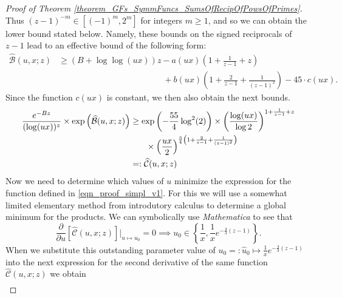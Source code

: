 \documentclass[11pt,reqno,a4letter]{article}
\numberwithin{figure}{section}
\numberwithin{table}{section}
\theoremstyle{plain}
\numberwithin{theorem}{section}
\theoremstyle{definition}
\begin{document}
\begin{proof}[Proof of Theorem \ref{theorem_GFs_SymmFuncs_SumsOfRecipOfPowsOfPrimes}]
Thus $(z-1)^{-m} \in [(-1)^m, 2^m]$ for integers $m \geq 1$, and so we can obtain the 
lower bound stated below. Namely, these bounds on the signed reciprocals of $z-1$ 
lead to an effective bound of the following form: 
\begin{align*} 
\widehat{\mathcal{B}}(u, x; z) & \geq (B + \log\log (ux)) z - a(ux) \left(1 + \frac{1}{z-1} + z\right) \\ 
     & \phantom{= (B + \log\log (ux)) z\ } + 
     b(ux) \left( 
     1 + \frac{2}{z-1} + \frac{1}{(z-1)^2}\right) - 
     45 \cdot c(ux). 
\end{align*} 
Since the function $c(ux)$ is constant, we then also obtain the next bounds. 
\begin{align} 
\notag 
\frac{e^{-Bz}}{(\log (ux))^{z}} \times \exp\left(\widehat{\mathcal{B}}(u, x; z)\right) & \geq 
    \exp\left(-\frac{55}{4} \log^2(2)\right) \times \left(\frac{\log(ux)}{\log 2}\right)^{1 + \frac{1}{z-1} + z} \\ 
\notag 
    & \phantom{\geq \times} \times \left(\frac{ux}{2}\right)^{\frac{3}{4}\left(1 + \frac{2}{z-1} + \frac{1}{(z-1)^2}\right)} \\ 
\label{eqn_proof_simpl_v1} 
     & =: \widehat{\mathcal{C}}(u, x; z) 
\end{align} 
Now we need to determine which values of $u$ minimize the expression for the function defined 
in \eqref{eqn_proof_simpl_v1}. 
For this we will use a somewhat limited elementary method from 
introdutory calculus to determine a global minimum for the products. 
We can symbolically use \emph{Mathematica} to see that 
\[
\frac{\partial}{\partial u}\left[\widehat{\mathcal{C}}(u, x; z)\right] \Biggr\rvert_{u \mapsto u_0} = 0 \implies 
     u_0 \in \left\{\frac{1}{x}, \frac{1}{x} e^{-\frac{4}{3}(z-1)}\right\}. 
\]
When we substitute this outstanding parameter value of $u_0 =: \hat{u}_0 \mapsto \frac{1}{x} e^{-\frac{4}{3}(z-1)}$ 
into the next expression for the second derivative of the same function 
$\widehat{\mathcal{C}}(u, x; z)$ we obtain 
\begin{align*} 

\end{align*}
\end{proof}
\end{document}

